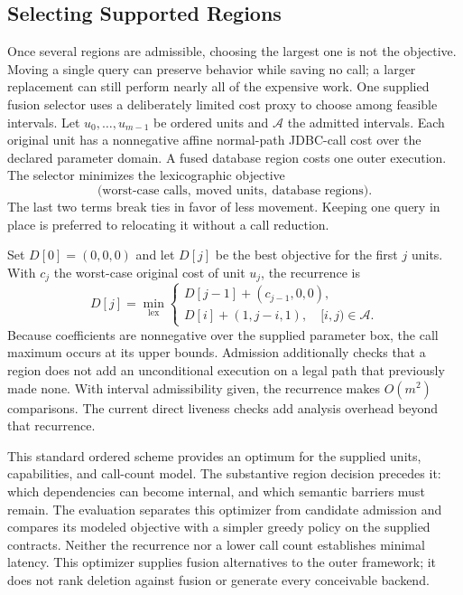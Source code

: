 \documentclass[acmsmall,screen,review,anonymous]{acmart}
\begin{document}
\subsection{Selecting Supported Regions}
Once several regions are admissible, choosing the largest one is not the
objective. Moving a single query can preserve behavior while saving no call;
a larger replacement can still perform nearly all of the expensive work.
One supplied fusion selector uses a deliberately limited cost proxy to choose
among feasible intervals. Let $u_0,\ldots,u_{m-1}$ be ordered units and
$\mathcal{A}$ the admitted intervals. Each original unit has a nonnegative
affine normal-path JDBC-call cost over the declared parameter domain. A fused
database region costs one outer execution. The selector minimizes the
lexicographic objective
\begin{equation}
  \bigl(\text{worst-case calls},\ \text{moved units},\
  \text{database regions}\bigr).
\end{equation}
The last two terms break ties in favor of less movement. Keeping one query in
place is preferred to relocating it without a call reduction.

Set $D[0]=(0,0,0)$ and let $D[j]$ be the best objective for the first $j$
units. With $c_j$ the worst-case original cost of unit $u_j$, the recurrence is
\begin{equation}
 D[j]=\min_{\mathrm{lex}}\left\{
 \begin{array}{l}
 D[j-1]+(c_{j-1},0,0),\\
 D[i]+(1,j-i,1),\quad [i,j)\in\mathcal{A}.
 \end{array}\right.
 \label{eq:dp}
\end{equation}
Because coefficients are nonnegative over the supplied parameter box, the
call maximum occurs at its upper bounds. Admission additionally checks that a
region does not add an unconditional execution on a legal path that previously
made none. With interval admissibility given, the recurrence makes
$O(m^2)$ comparisons. The current direct liveness checks add analysis overhead
beyond that recurrence.

This standard ordered scheme provides an optimum for the supplied units,
capabilities, and call-count model. The substantive region decision precedes
it: which dependencies can become internal, and which semantic barriers must
remain. The evaluation separates this optimizer from candidate admission and compares
its modeled objective with a simpler greedy policy on the supplied contracts.
Neither the recurrence nor a lower call count establishes minimal latency.
This optimizer supplies fusion alternatives to the outer framework; it does
not rank deletion against fusion or generate every conceivable backend.
\end{document}
